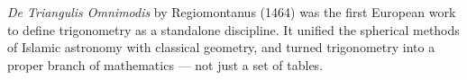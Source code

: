 \begin{tcolorbox}[colback=gray!5!white, colframe=black, title=\textbf{TL;DR: The First Book of Trigonometry}, fonttitle=\bfseries, arc=1.5mm, boxrule=0.4pt]
\textit{De Triangulis Omnimodis} by Regiomontanus (1464) was the first European work to define trigonometry as a standalone discipline.  
It unified the spherical methods of Islamic astronomy with classical geometry, and turned trigonometry into a proper branch of mathematics — not just a set of tables.
\end{tcolorbox}




